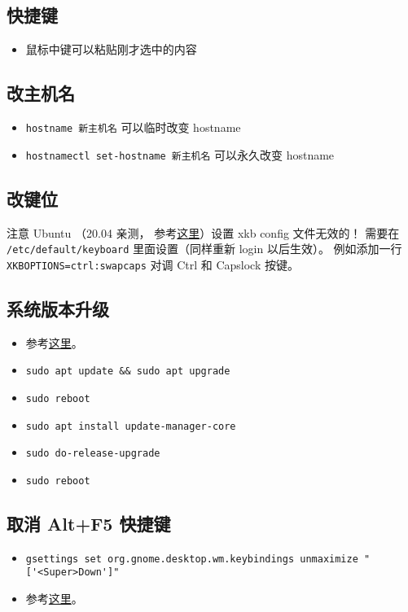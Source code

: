 
\subsection{快捷键}
\begin{itemize}
\item 鼠标中键可以粘贴刚才选中的内容
\end{itemize}


\subsection{改主机名}
\begin{itemize}
\item \verb|hostname 新主机名| 可以临时改变 hostname
\item \verb|hostnamectl set-hostname 新主机名| 可以永久改变 hostname
\end{itemize}


\subsection{改键位}\label{sub_Ubuntu_1}
注意 Ubuntu （20.04 亲测， 参考\href{https://manpages.ubuntu.com/manpages/focal/en/man5/keyboard.5.html}{这里}）设置 xkb config 文件无效的！ 需要在 \verb|/etc/default/keyboard| 里面设置（同样重新 login 以后生效）。 例如添加一行 \verb|XKBOPTIONS=ctrl:swapcaps| 对调 Ctrl 和 Capslock 按键。

\subsection{系统版本升级}
\begin{itemize}
\item 参考\href{https://www.cyberciti.biz/faq/upgrade-ubuntu-18-04-to-20-04-lts-using-command-line/#Make_a_backup}{这里}。
\item \verb|sudo apt update && sudo apt upgrade|
\item \verb|sudo reboot|
\item \verb|sudo apt install update-manager-core|
\item \verb|sudo do-release-upgrade|
\item \verb|sudo reboot|
\end{itemize}

\subsection{取消 Alt+F5 快捷键}
\begin{itemize}
\item \verb|gsettings set org.gnome.desktop.wm.keybindings unmaximize "['<Super>Down']"|
\item 参考\href{https://askubuntu.com/questions/1322105/cant-find-alt-f5-in-settings-keyboard-shortcuts}{这里}。
\end{itemize}


